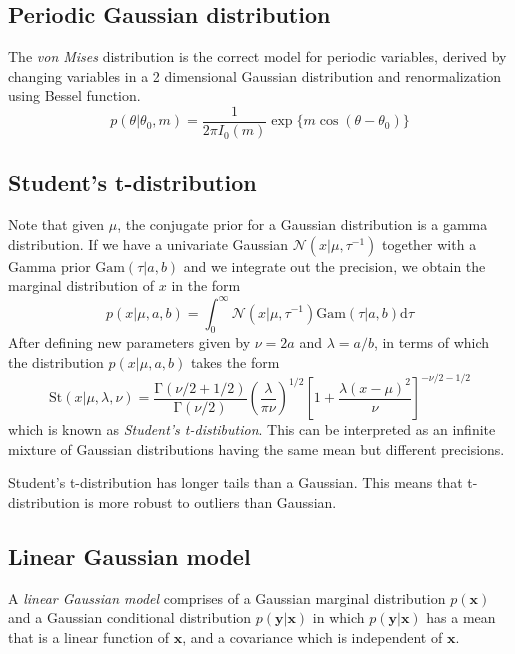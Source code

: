 \documentclass[a4paper]{report}
\newcommand{\ud}{\mathrm{d}}
\newcommand{\up}{\mathrm}
\renewcommand{\bf}{\mathbf}
\renewcommand{\cal}{\mathcal}
\newcommand{\imp}[1]{{\color{blue}\textit{#1}}}
\begin{document}
\subsection{Periodic Gaussian distribution}
The \emph{von Mises} distribution is the correct model for periodic variables, derived by changing variables in a 2 dimensional Gaussian distribution and renormalization using Bessel function.
\begin{equation}
	p(\theta|\theta_0,m)=\frac{1}{2\pi I_{0} (m)} \exp \{m \cos(\theta-\theta_0) \}
\end{equation}
\subsection{Student's t-distribution}
Note that given $\mu$, the conjugate prior for a Gaussian distribution is a gamma distribution. If we have a univariate Gaussian $\cal{N}(x|\mu,\tau^{-1})$ together with a Gamma prior $\up{Gam}(\tau|a,b)$ and we integrate out the precision, we obtain the marginal distribution of $x$ in the form
\begin{equation}
	p(x|\mu,a,b)=\int_{0}^{\infty} \cal{N}(x|\mu,\tau^{-1})\up{Gam}(\tau|a,b) \ud \tau
\end{equation}
After defining new parameters given by $\nu = 2a$ and $\lambda=a/b$, in terms of which the distribution $p(x|\mu,a,b)$ takes the form
\begin{equation}
	\up{St}(x|\mu,\lambda,\nu)=\frac{\up{\Gamma}(\nu/2+1/2)}{\up{\Gamma}(\nu/2)}\left(\frac{\lambda}{\pi \nu}\right)^{1/2}\left[1+\frac{\lambda(x-\mu)^2}{\nu}\right]^{-\nu/2-1/2}
\end{equation}
which is known as \emph{Student's t-distibution}. This can be interpreted as an infinite mixture of Gaussian distributions having the same mean but different precisions.

Student's t-distribution has longer tails than a Gaussian. This means that t-distribution is more robust to outliers than Gaussian.
\subsection{Linear Gaussian model}
A \imp{linear Gaussian model} comprises of a Gaussian marginal distribution $p(\bf{x})$ and a Gaussian conditional distribution $p(\bf{y}|\bf{x})$ in which $p(\bf{y}|\bf{x})$ has a mean that is a linear function of $\bf{x}$, and a covariance which is independent of $\bf{x}$.
\end{document}
